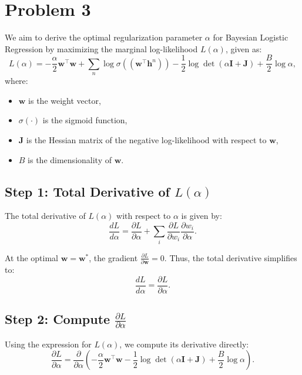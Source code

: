 \documentclass{article}
\begin{document}

\section*{Problem 3} 


We aim to derive the optimal regularization parameter \(\alpha\) for Bayesian Logistic Regression by maximizing the marginal log-likelihood \(L(\alpha)\), given as:
\[
L(\alpha) = -\frac{\alpha}{2} \mathbf{w}^\top \mathbf{w} + \sum_n \log \sigma((\mathbf{w}^\top \mathbf{h}^n)) - \frac{1}{2} \log \det (\alpha \mathbf{I} + \mathbf{J}) + \frac{B}{2} \log \alpha,
\]
where:
\begin{itemize}
    \item \(\mathbf{w}\) is the weight vector,
    \item \(\sigma(\cdot)\) is the sigmoid function,
    \item \(\mathbf{J}\) is the Hessian matrix of the negative log-likelihood with respect to \(\mathbf{w}\),
    \item \(B\) is the dimensionality of \(\mathbf{w}\).
\end{itemize}

\subsection*{Step 1: Total Derivative of \(L(\alpha)\)}

The total derivative of \(L(\alpha)\) with respect to \(\alpha\) is given by:
\[
\frac{dL}{d\alpha} = \frac{\partial L}{\partial \alpha} + \sum_i \frac{\partial L}{\partial w_i} \frac{\partial w_i}{\partial \alpha}.
\]

At the optimal \(\mathbf{w} = \mathbf{w}^*\), the gradient \(\frac{\partial L}{\partial \mathbf{w}} = 0\). Thus, the total derivative simplifies to:
\[
\frac{dL}{d\alpha} = \frac{\partial L}{\partial \alpha}.
\]

\subsection*{Step 2: Compute \(\frac{\partial L}{\partial \alpha}\)}

Using the expression for \(L(\alpha)\), we compute its derivative directly:
\[
\frac{\partial L}{\partial \alpha} = \frac{\partial}{\partial \alpha} \left( -\frac{\alpha}{2} \mathbf{w}^\top \mathbf{w} - \frac{1}{2} \log \det (\alpha \mathbf{I} + \mathbf{J}) + \frac{B}{2} \log \alpha \right).
\]
\end{document}
